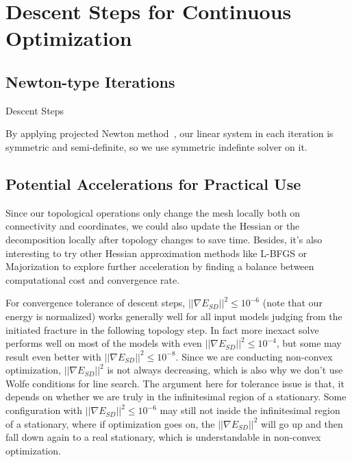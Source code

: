 \section{Descent Steps for Continuous Optimization}

\subsection{Newton-type Iterations}

\begin{algorithm}[h]
\SetAlgoLined
{}
\caption{Descent Steps}
\end{algorithm}
By applying projected Newton method~\cite{Teran2005Robust}, our linear system in each iteration is symmetric and semi-definite, so we use symmetric indefinte solver on it.

\subsection{Potential Accelerations for Practical Use}

Since our topological operations only change the mesh locally both on connectivity and coordinates, we could also update the Hessian or the decomposition locally after topology changes to save time. Besides, it's also interesting to try other Hessian approximation methods like L-BFGS or Majorization to explore further acceleration by finding a balance between computational cost and convergence rate.

For convergence tolerance of descent steps, $||\nabla E_{SD}||^2 \leq 10^{-6}$ (note that our energy is normalized) works generally well for all input models judging from the initiated fracture in the following topology step. In fact more inexact solve performs well on most of the models with even $||\nabla E_{SD}||^2 \leq 10^{-4}$, but some may result even better with $||\nabla E_{SD}||^2 \leq 10^{-8}$. Since we are conducting non-convex optimization, $||\nabla E_{SD}||^2$ is not always decreasing, which is also why we don't use Wolfe conditions for line search. The argument here for tolerance issue is that, it depends on whether we are truly in the infinitesimal region of a stationary. Some configuration with $||\nabla E_{SD}||^2 \leq 10^{-6}$ may still not inside the infinitesimal region of a stationary, where if optimization goes on, the $||\nabla E_{SD}||^2$ will go up and then fall down again to a real stationary, which is understandable in non-convex optimization.